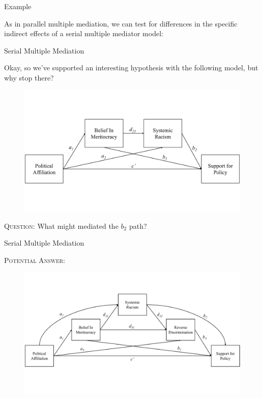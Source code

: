 \documentclass{beamer}
\newcommand{\vx}[1]{\vspace{#1pt}}
\begin{document}
\begin{frame}[allowframebreaks]{Example}

  As in parallel multiple mediation, we can test for differences in
  the specific indirect effects of a serial multiple mediator model:
  


\end{frame}



\begin{frame}{Serial Multiple Mediation}

  Okay, so we've supported an interesting hypothesis with the
  following model, but why stop there?
  
  \vx{-12}
  
  \begin{figure}
    \includegraphics[width=\textwidth]{figures/adamsKlpsSerial1.pdf}
  \end{figure}

  \vx{-12}
  
  \textsc{Question:} What might mediated the $b_2$ path?
  
\end{frame}



\begin{frame}{Serial Multiple Mediation}

  \textsc{Potential Answer:}
  
  \begin{figure}
    \includegraphics[width=\textwidth]{figures/adamsKlpsSerial2.pdf}
  \end{figure}

\end{frame}
\end{document}
